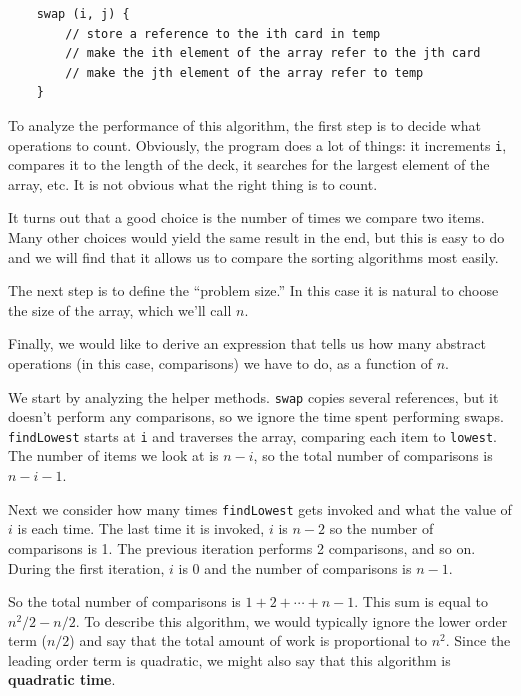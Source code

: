 \documentclass[12pt]{book}
\theoremstyle{exercise}
\begin{document}
\begin{verbatim}
    swap (i, j) {
        // store a reference to the ith card in temp
        // make the ith element of the array refer to the jth card
        // make the jth element of the array refer to temp
    }
\end{verbatim}
%
To analyze the performance of this algorithm, 
the first step is to decide what operations to count.  Obviously,
the program does a lot of things: it increments {\tt i}, compares
it to the length of the deck, it searches for the largest element
of the array, etc.  It is not obvious what the right thing is
to count.


It turns out that a good choice is the number of
times we compare two items.  Many other choices would yield
the same result in the end, but this is easy to do and we will
find that it allows us to compare the sorting algorithms
most easily.

The next step is to define the ``problem size.''  In this case
it is natural to choose the size of the array, which we'll call
$n$.

Finally, we would like to derive an expression that tells us how
many abstract operations (in this case, comparisons) we have to
do, as a function of $n$.


We start by analyzing the helper methods.  {\tt swap} copies several
references, but it doesn't perform any comparisons, so we ignore the
time spent performing swaps.  {\tt findLowest} starts at {\tt i} and
traverses the array, comparing each item to {\tt lowest}.  The number
of items we look at is $n-i$, so the total number of comparisons is
$n-i-1$.

Next we consider how many times {\tt findLowest}
gets invoked and what the value of $i$ is each time.  The last
time it is invoked, $i$ is $n-2$ so the number of
comparisons is 1.  The previous iteration performs 2 comparisons,
and so on.  During the first iteration, $i$ is $0$ and the
number of comparisons is $n-1$.

So the total number of comparisons is $1 + 2 + \cdots + n-1$.
This sum is equal to $n^2/2 - n/2$.  To describe this algorithm,
we would typically ignore the lower order term ($n/2$) and say
that the total amount of work is proportional to $n^2$.  Since
the leading order term is quadratic, we might also say that this
algorithm is {\bf quadratic time}.
\end{document}
